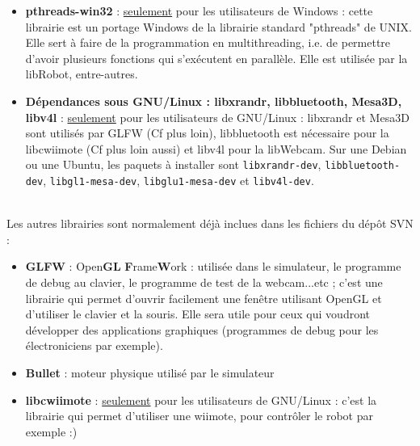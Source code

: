 \begin{itemize}
\item \textbf{pthreads-win32} : \underline{seulement} pour les utilisateurs de Windows : cette librairie est un portage Windows de la librairie standard "pthreads" de UNIX. Elle sert à faire de la programmation en multithreading, i.e. de permettre d'avoir plusieurs fonctions qui s'exécutent en parallèle. Elle est utilisée par la libRobot, entre-autres.\\
\item \textbf{Dépendances sous GNU/Linux : libxrandr, libbluetooth, Mesa3D, libv4l} : \underline{seulement} pour les utilisateurs de GNU/Linux : libxrandr et Mesa3D sont utilisés par GLFW (Cf plus loin), libbluetooth est nécessaire pour la libcwiimote (Cf plus loin aussi) et libv4l pour la libWebcam. Sur une Debian ou une Ubuntu, les paquets à installer sont \texttt{libxrandr-dev}, \texttt{libbluetooth-dev}, \texttt{libgl1-mesa-dev}, \texttt{libglu1-mesa-dev} et \texttt{libv4l-dev}.\\
\\
\end{itemize}

Les autres librairies sont normalement déjà inclues dans les fichiers du dépôt SVN :\\
\begin{itemize}
\item \textbf{GLFW} : Open\textbf{GL} \textbf{F}rame\textbf{W}ork : utilisée dans le simulateur, le programme de debug au clavier, le programme de test de la webcam...etc ; c'est une librairie qui permet d'ouvrir facilement une fenêtre utilisant OpenGL et d'utiliser le clavier et la souris. Elle sera utile pour ceux qui voudront développer des applications graphiques (programmes de debug pour les électroniciens par exemple).\\
\item \textbf{Bullet} : moteur physique utilisé par le simulateur\\
\item \textbf{libcwiimote} : \underline{seulement} pour les utilisateurs de GNU/Linux : c'est la librairie qui permet d'utiliser une wiimote, pour contrôler le robot par exemple :)\\
\end{itemize}
